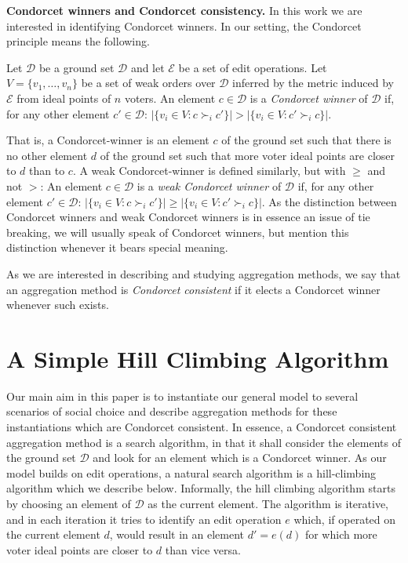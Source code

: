 \documentclass[sigconf]{aamas}  %
\newcommand{\mypara}[1]{\smallskip\noindent\textbf{#1.}}
\newcommand{\calD}{\mathcal{D}}
\newcommand{\calE}{\mathcal{E}}
\newcommand{\prefers}[1]{\succ_{#1}}
\begin{document}
\mypara{Condorcet winners and Condorcet consistency}
%
In this work we are interested in identifying Condorcet winners.
In our setting, the Condorcet principle means the following.

\begin{definition}
%
Let $\calD$ be a ground set $\calD$ and let $\calE$ be a set of edit operations.
Let $V = \{v_1, \ldots, v_n\}$ be a set of weak orders over $\calD$ inferred by the metric induced by $\calE$ from ideal points of $n$ voters.
An element $c \in \calD$ is a \emph{Condorcet winner} of $\calD$ if,
for any other element $c' \in \calD$:  $|\{ v_i \in V : c \prefers{i} c' \}| > |\{ v_i \in V : c' \prefers{i} c \}|$.
%
\end{definition}

That is,
a Condorcet-winner is an element $c$ of the ground set such that there is no other element $d$ of the ground set such that more voter ideal points are closer to $d$ than to $c$.
A weak Condorcet-winner is defined similarly, but with $\geq$ and not $>$:
  An element $c \in \calD$ is a \emph{weak Condorcet winner} of $\calD$ if,
  for any other element $c' \in \calD$:  $|\{ v_i \in V : c \prefers{i} c' \}| \geq |\{ v_i \in V : c' \prefers{i} c \}|$.
As the distinction between Condorcet winners and weak Condorcet winners is in essence an issue of tie breaking,
we will usually speak of Condorcet winners, but mention this distinction whenever it bears special meaning.

As we are interested in describing and studying aggregation methods,
we say that an aggregation method is \emph{Condorcet consistent} if it elects a Condorcet winner whenever such exists.


\section{A Simple Hill Climbing Algorithm}

Our main aim in this paper is to instantiate our general model to several scenarios of social choice and describe aggregation methods for these instantiations which are Condorcet consistent.
In essence, a Condorcet consistent aggregation method is a search algorithm, in that it shall consider the elements of the ground set $\calD$ and look for an element which is a Condorcet winner.
As our model builds on edit operations, a natural search algorithm is a hill-climbing algorithm which we describe below.
Informally, the hill climbing algorithm starts by choosing an element of $\calD$ as the current element.
The algorithm is iterative, and in each iteration it tries to identify an edit operation $e$ which,
if operated on the current element $d$, would result in an element $d' = e(d)$ for which more voter ideal points are closer to $d$ than vice versa.
\end{document}
